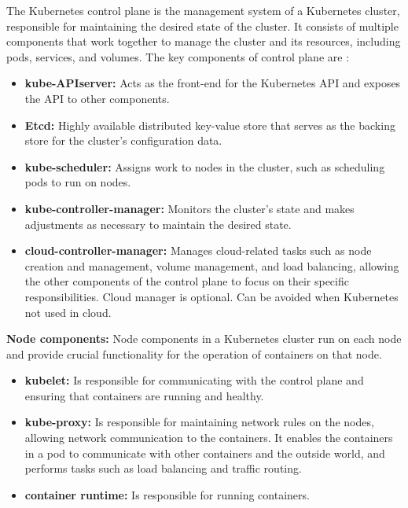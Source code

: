 The Kubernetes control plane is the management system of a Kubernetes cluster, responsible for maintaining the desired state of the cluster. It consists of multiple components that work together to manage the cluster and its resources, including pods, services, and volumes. The key components of control plane are \cite{masteringKubernetesConcepts}:
\begin{itemize}
  \item \textbf{kube-APIserver:} Acts as the front-end for the Kubernetes API and exposes the API to other components. \cite{docuKubeComponents}
  \item \textbf{Etcd:} Highly available distributed key-value store that serves as the backing store for the cluster's configuration data. \cite{Dobies2020}
  \item \textbf{kube-scheduler:} Assigns work to nodes in the cluster, such as scheduling pods to run on nodes. \cite{kubeUpAndRunningPods}
  \item \textbf{kube-controller-manager:} Monitors the cluster's state and makes adjustments as necessary to maintain the desired state. \cite{masteringKubernetesConcepts}
  \item \textbf{cloud-controller-manager:} Manages cloud-related tasks such as node creation and management, volume management, and load balancing, allowing the other components of the control plane to focus on their specific responsibilities. Cloud manager is optional. Can be avoided when Kubernetes not used in cloud. \cite{docuKubeComponents}
\end{itemize}
\textbf{Node components:}
Node components in a Kubernetes cluster run on each node and provide crucial functionality for the operation of containers on that node. \cite{docuKubeComponents}
\begin{itemize}
  \item \textbf{kubelet:} Is responsible for communicating with the control plane and ensuring that containers are running and healthy. \cite{kubeUpAndRunning}
  \item \textbf{kube-proxy:} Is responsible for maintaining network rules on the nodes, allowing network communication to the containers. It enables the containers in a pod to communicate with other containers and the outside world, and performs tasks such as load balancing and traffic routing. \cite{kubeUpAndRunning}
  \item \textbf{container runtime:} Is responsible for running containers. \cite{docuKubeComponents}
\end{itemize}

